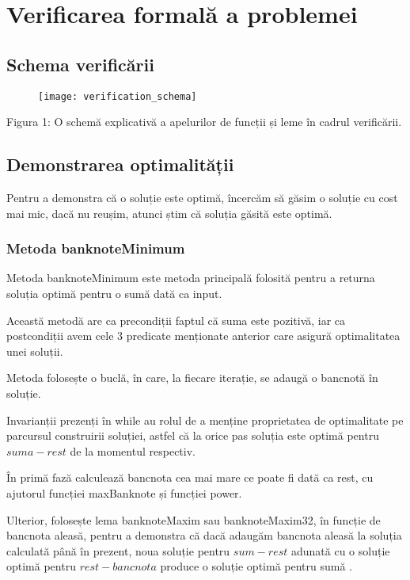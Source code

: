 

\chapter{Verificarea formală a problemei}

\section{Schema verificării}
    \vspace{1cm}
\setcounter{figure}{0}
    \begin{figure}[h]
        \centering
          \texttt{[image: verification\_schema]}
      \end{figure}
Figura 1: O schemă explicativă a apelurilor de funcții și leme în cadrul verificării.
    

\section{Demonstrarea optimalității}

    Pentru a demonstra că o soluție este optimă, încercăm să găsim o soluție cu cost mai mic, dacă nu reușim, atunci 
    știm că soluția găsită este optimă.\cite{kozen1993optimal}
  
  \subsection{Metoda banknoteMinimum}
    Metoda banknoteMinimum este metoda principală folosită pentru a returna soluția optimă pentru o sumă dată ca 
    input.\par
    Această metodă are ca precondiții faptul că suma este pozitivă, iar ca postcondiții avem cele 3 predicate menționate 
    anterior care asigură optimalitatea unei soluții.\par
    Metoda folosește o buclă, în care, la fiecare iterație, se adaugă o bancnotă în soluție.\par
    Invarianții prezenți în while au rolul de a menține proprietatea de optimalitate 
    pe parcursul construirii soluției, astfel că la orice pas soluția este optimă pentru $suma-rest$ de la momentul respectiv.\par
    În primă fază calculează bancnota cea mai mare ce poate fi dată ca rest, cu ajutorul funcției maxBanknote și funcției 
    power.\par
    Ulterior, folosește lema banknoteMaxim sau banknoteMaxim32, în funcție de bancnota aleasă, pentru a demonstra 
    că dacă adaugăm bancnota aleasă la soluția calculată până în prezent, noua soluție pentru $sum-rest$ adunată cu o 
    soluție optimă pentru $rest - bancnota$ produce o soluție optimă pentru sumă .\par
    
